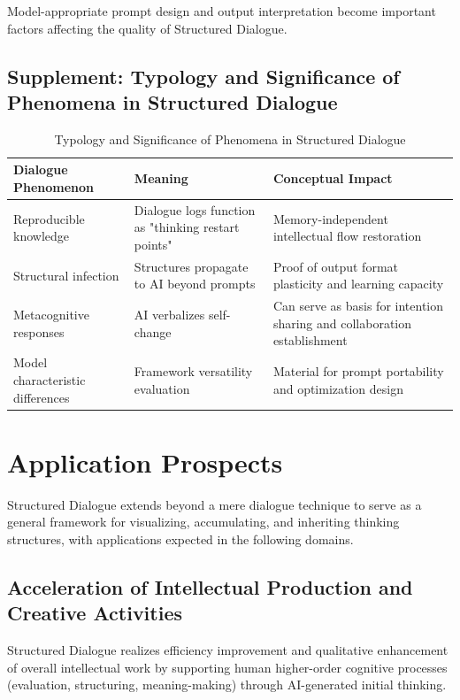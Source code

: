 \documentclass[11pt]{article}
\begin{document}
Model-appropriate prompt design and output interpretation become important factors affecting the quality of Structured Dialogue.
\subsection{Supplement: Typology and Significance of Phenomena in Structured Dialogue}

\begin{table}[htbp]
\centering
\caption{Typology and Significance of Phenomena in Structured Dialogue}
\begin{tabular}{p{3.5cm}|p{3.5cm}|p{5cm}}
\hline
\textbf{Dialogue Phenomenon} & \textbf{Meaning} & \textbf{Conceptual Impact} \\
\hline
Reproducible knowledge & Dialogue logs function as "thinking restart points" & Memory-independent intellectual flow restoration \\
\hline
Structural infection & Structures propagate to AI beyond prompts & Proof of output format plasticity and learning capacity \\
\hline
Metacognitive responses & AI verbalizes self-change & Can serve as basis for intention sharing and collaboration establishment \\
\hline
Model characteristic differences & Framework versatility evaluation & Material for prompt portability and optimization design \\
\hline
\end{tabular}
\label{tab:phenomena-typology}
\end{table}
\section{Application Prospects}
Structured Dialogue extends beyond a mere dialogue technique to serve as a general framework for visualizing, accumulating, and inheriting thinking structures, with applications expected in the following domains.
\subsection{Acceleration of Intellectual Production and Creative Activities}
Structured Dialogue realizes efficiency improvement and qualitative enhancement of overall intellectual work by supporting human higher-order cognitive processes (evaluation, structuring, meaning-making) through AI-generated initial thinking.
\end{document}

